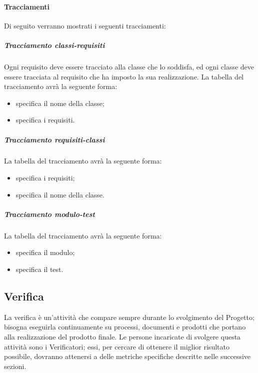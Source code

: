 
\paragraph{Tracciamenti}
Di seguito verranno mostrati i seguenti tracciamenti:
\label{}
\subparagraph{Tracciamento classi-requisiti}
Ogni requisito deve essere tracciato alla classe che lo soddisfa, ed ogni classe deve essere tracciata al requisito che ha imposto la sua realizzazione.
La tabella del tracciamento avrà la seguente forma:
\begin{itemize}
\item {}specifica il nome della classe;
\item {}specifica i requisiti.
\end{itemize}
\subparagraph{Tracciamento requisiti-classi}
La tabella del tracciamento avrà la seguente forma:
\begin{itemize}
\item {}specifica i requisiti;
\item {}specifica il nome della classe.
\end{itemize}
\subparagraph{Tracciamento modulo-test}
La tabella del tracciamento avrà la seguente forma:
\begin{itemize}
\item {}specifica il modulo;
\item {}specifica il test.
\end{itemize}


\newpage
\subsection{Verifica}
La verifica è un'attività che compare sempre durante lo svolgimento del Progetto; bisogna eseguirla continuamente su processi, documenti e prodotti che portano alla realizzazione del prodotto finale. Le persone incaricate di svolgere questa attività sono i Verificatori; essi, per cercare di ottenere il miglior risultato possibile, dovranno attenersi a delle metriche specifiche descritte nelle successive sezioni.
\label{11.0}

